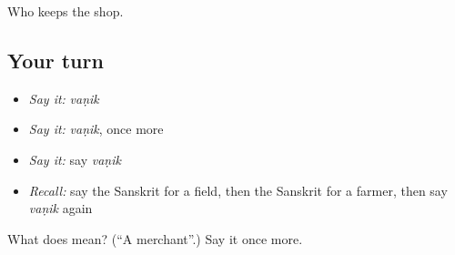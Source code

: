 \begin{grammarlens}[title={What you've built}]
Who keeps the shop.
\end{grammarlens}

\subsection*{Your turn}
\begin{itemize}
\raggedright
  \item \emph{Say it:} \emph{vaṇik}
  \item \emph{Say it:} \emph{vaṇik}, once more
  \item \emph{Say it:} say \emph{vaṇik}
  \item \emph{Recall:} say the Sanskrit for a field, then the Sanskrit for a farmer, then say \emph{vaṇik} again
\end{itemize}

\begin{tcolorbox}[breakable,colback=teal!4,colframe=teal!35!black,title={Before you move on}]
What does  mean? (\textquotedblleft{}A merchant\textquotedblright{}.) Say it once more.
\end{tcolorbox}
